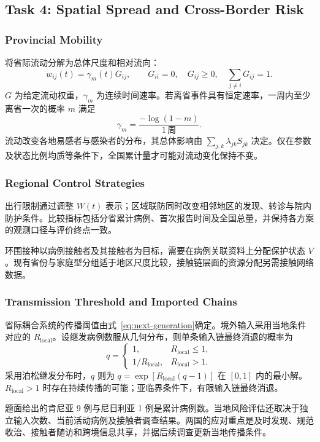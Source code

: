\subsection{Task 4: Spatial Spread and Cross-Border Risk}
\label{sec:task-4}

\subsubsection{Provincial Mobility}

将省际流动分解为总体尺度和相对流向：
\begin{equation}
w_{ij}(t)=\gamma_m(t)G_{ij},\qquad
G_{ii}=0,\quad G_{ij}\geq0,\quad
\sum_{j\ne i}G_{ij}=1.
\label{eq:mobility-scale}
\end{equation}
$G$ 为给定流动权重，$\gamma_m$ 为连续时间速率。若离省事件具有恒定速率，一周内至少离省一次的概率 $m$ 满足
\begin{equation}
\gamma_m=\frac{-\log(1-m)}{1\,\text{周}}.
\label{eq:rate-probability}
\end{equation}
流动改变各地易感者与感染者的分布，其总体影响由 $\sum_{j,k}\lambda_{jk}S_{jk}$ 决定。仅在参数及状态比例均质等条件下，全国累计量才可能对流动变化保持不变。

\subsubsection{Regional Control Strategies}

出行限制通过调整 $W(t)$ 表示；区域联防同时改变相邻地区的发现、转诊与院内防护条件。比较指标包括分省累计病例、首次报告时间及全国总量，并保持各方案的观测口径与评价终点一致。

环围接种以病例接触者及其接触者为目标，需要在病例关联资料上分配保护状态 $V$。现有省份与家庭型分组适于地区尺度比较，接触链层面的资源分配另需接触网络数据。

\subsubsection{Transmission Threshold and Imported Chains}

省际耦合系统的传播阈值由式~\eqref{eq:next-generation}确定。境外输入采用当地条件对应的 $R_{\mathrm{local}}$。设继发病例数服从几何分布，则单条输入链最终消退的概率为
\begin{equation}
q=\begin{cases}
1,&R_{\mathrm{local}}\leq1,\\
1/R_{\mathrm{local}},&R_{\mathrm{local}}>1.
\end{cases}
\label{eq:chain-extinction}
\end{equation}
采用泊松继发分布时，$q$ 则为 $q=\exp[R_{\mathrm{local}}(q-1)]$ 在 $[0,1]$ 内的最小解。$R_{\mathrm{local}}>1$ 时存在持续传播的可能；亚临界条件下，有限输入链最终消退。

题面给出的肯尼亚 9 例与尼日利亚 1 例是累计病例数。当地风险评估还取决于独立输入次数、当前活动病例及接触者调查结果。两国的应对重点是及时发现、规范收治、接触者随访和跨境信息共享，并据后续调查更新当地传播条件。
